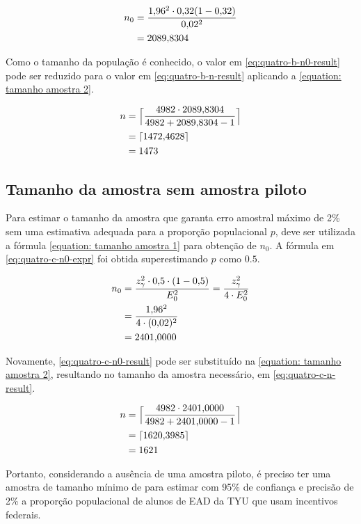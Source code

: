 	\begin{align}
		n_0 &= \frac{\num{1.96}^2 \cdot \num{0.32}(1-\num{0.32})}{\num{0.02}^2} \nonumber \\
			&= \label{eq:quatro-b-n0-result}
			   \num{2089.8304}	
	\end{align}

	Como o tamanho da população é conhecido, o valor em
	\eqref{eq:quatro-b-n0-result} pode ser reduzido para o valor em
	\eqref{eq:quatro-b-n-result} aplicando a \autoref{equation: tamanho amostra 2}.

	\begin{align}
		n &= \Big\lceil \frac{4982 \cdot  \num{2089.8304}}{4982 + \num{2089.8304} - 1} \nonumber \Big\rceil \\
		  &= \lceil \num{1472.4628} \nonumber \rceil \\
		  &= \label{eq:quatro-b-n-result} 1473
	\end{align}

\subsection{Tamanho da amostra sem amostra piloto}

	Para estimar o tamanho da amostra que garanta erro amostral máximo de
	2\% sem uma estimativa adequada para a proporção populacional $p$, deve
	ser utilizada a fórmula \autoref{equation: tamanho amostra 1} para obtenção de
	$n_0$. A fórmula em \eqref{eq:quatro-c-n0-expr} foi obtida
	superestimando $p$ como $\num{0.5}$.

	\begin{align}
		n_0 &= \label{eq:quatro-c-n0-expr}
               \frac{z_\gamma^2 \cdot \num{0.5} \cdot (1 - \num{0.5})}{E_0^2} = \frac{z_\gamma^2}{4 \cdot E_0^2} \\
			&= \frac{\num{1.96}^2}{4 \cdot (\num{0.02})^2} \nonumber \\
			&= \label{eq:quatro-c-n0-result}
			   \num{2401.0000}
	\end{align}

	Novamente, \eqref{eq:quatro-c-n0-result} pode ser substituído na 
    \autoref{equation: tamanho amostra 2}, resultando no tamanho da amostra necessário, em
	\eqref{eq:quatro-c-n-result}.

	\begin{align}
		n &= \Big\lceil \frac{4982 \cdot \num{2401.0000}}{4982 + \num{2401.0000} -1} \nonumber \Big\rceil \\
		  &= \lceil \num{1620.3985} \nonumber \rceil \\
		  &= \label{eq:quatro-c-n-result} 
			 1621
	\end{align}

	Portanto, considerando a ausência de uma amostra piloto, é preciso ter
	uma amostra de tamanho mínimo de \QUATROCnceil para estimar com 95\% de
	confiança e precisão de 2\% a proporção populacional de alunos de EAD da
	TYU que usam incentivos federais.
